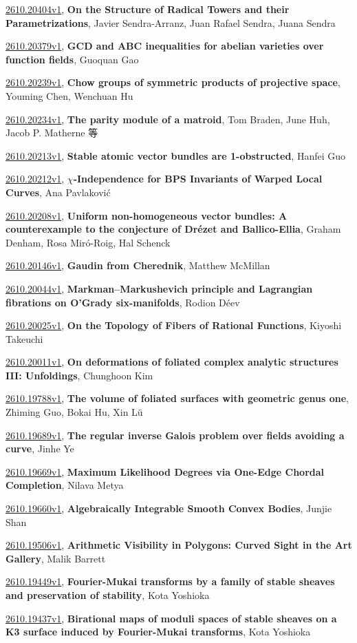 \documentclass[9pt, a4paper]{article}
\theoremstyle{plain}
\theoremstyle{definition}
\theoremstyle{remark}
\newcommand{\arxiv}[3]{\href{https://arxiv.org/abs/#1}{#1}, \textbf{\textcolor{arxivblue}{#2}}, #3}
\begin{document}
\arxiv{2610.20404v1}{On the Structure of Radical Towers and their Parametrizations}{Javier Sendra-Arranz, Juan Rafael Sendra, Juana Sendra}

\arxiv{2610.20379v1}{GCD and ABC inequalities for abelian varieties over function fields}{Guoquan Gao}

\arxiv{2610.20239v1}{Chow groups of symmetric products of projective space}{Youming Chen, Wenchuan Hu}

\arxiv{2610.20234v1}{The parity module of a matroid}{Tom Braden, June Huh, Jacob P. Matherne 等}

\arxiv{2610.20213v1}{Stable atomic vector bundles are 1-obstructed}{Hanfei Guo}

\arxiv{2610.20212v1}{$χ$-Independence for BPS Invariants of Warped Local Curves}{Ana Pavlaković}

\arxiv{2610.20208v1}{Uniform non-homogeneous vector bundles: A counterexample to the conjecture of Drézet and Ballico-Ellia}{Graham Denham, Rosa Miró-Roig, Hal Schenck}

\arxiv{2610.20146v1}{Gaudin from Cherednik}{Matthew McMillan}

\arxiv{2610.20044v1}{Markman--Markushevich principle and Lagrangian fibrations on O'Grady six-manifolds}{Rodion Déev}

\arxiv{2610.20025v1}{On the Topology of Fibers of Rational Functions}{Kiyoshi Takeuchi}

\arxiv{2610.20011v1}{On deformations of foliated complex analytic structures III: Unfoldings}{Chunghoon Kim}

\arxiv{2610.19788v1}{The volume of foliated surfaces with geometric genus one}{Zhiming Guo, Bokai Hu, Xin Lü}

\arxiv{2610.19689v1}{The regular inverse Galois problem over fields avoiding a curve}{Jinhe Ye}

\arxiv{2610.19669v1}{Maximum Likelihood Degrees via One-Edge Chordal Completion}{Nilava Metya}

\arxiv{2610.19660v1}{Algebraically Integrable Smooth Convex Bodies}{Junjie Shan}

\arxiv{2610.19506v1}{Arithmetic Visibility in Polygons: Curved Sight in the Art Gallery}{Malik Barrett}

\arxiv{2610.19449v1}{Fourier-Mukai transforms by a family of stable sheaves and preservation of stability}{Kota Yoshioka}

\arxiv{2610.19437v1}{Birational maps of moduli spaces of stable sheaves on a K3 surface induced by Fourier-Mukai transforms}{Kota Yoshioka}
\end{document}
